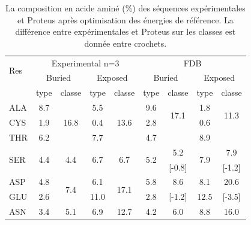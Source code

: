     \clearpage

   \begin{table}
     \centering
\caption{La composition en acide aminé (\%) des séquences expérimentales et Proteus après optimisation des énergies de référence. La différence entre expérimentales et Proteus sur les classes est donnée entre crochets.}
\begin{tabular}{l|cccc|cccc}
\hline
\multirow{2}{*}{Res} & \multicolumn{4}{c|}{Experimental n=3}& \multicolumn{4}{c}{FDB}\\
 & \multicolumn{2}{c}{Buried} & \multicolumn{2}{c|}{Exposed} & \multicolumn{2}{c}{Buried} & \multicolumn{2}{c}{Exposed} \\
\hline
 & type & classe & type & classe & type & classe & type & classe \\
\hline 
ALA                  & 8.7                  &  \multirow{3}{*}{16.8} & 5.5                  & \multirow{3}{*}{13.6}   &   9.6                & \multirow{2}{*}{17.1}    & 1.8 & \multirow{2}{*}{11.3} \\
CYS                  & 1.9                  &                        & 0.4                  &                         &    2.8               & \multirow{2}{*}{[-0.3]}  & 0.6 & \multirow{2}{*}{[2.3]} \\
THR                  & 6.2                  &                        & 7.7                  &                         &    4.7               &                          & 8.9 &                       \\
\hline
\multirow{2}{*}{SER} & \multirow{2}{*}{4.4} & \multirow{2}{*}{4.4}   & \multirow{2}{*}{6.7} & \multirow{2}{*}{6.7}    & \multirow{2}{*}{5.2} & 5.2                      & \multirow{2}{*}{7.9} & 7.9\\
                     &                      &                        &                      &                         &                      &  [-0.8]                  &                      & [-1.2] \\
\hline
ASP                  & 4.8                  & \multirow{2}{*}{7.4}   & 6.1                  & \multirow{2}{*}{17.1}   &   5.8                &  8.6                     & 8.1    & 20.6  \\
GLU                  & 2.6                  &                        & 11.0                 &                         &   2.8                &  [-1.2]                  & 12.5   &  [-3.5] \\
\hline
ASN                  & 3.4                  & \multirow{2}{*}{5.1}   & 6.9                  & \multirow{2}{*}{12.7}   &   4.2                &  6.0                     & 8.8 & 16.0 \\

\end{tabular}
\end{table}
